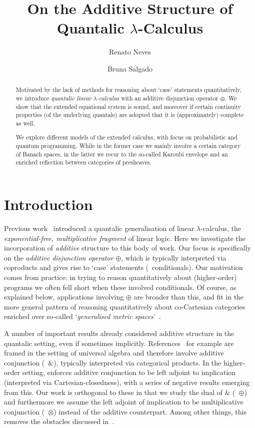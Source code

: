 \documentclass[submission,copyright,creativecommons]{eptcs}
\title{On the Additive Structure of Quantalic $\lambda$-Calculus}
\author{Renato Neves
\institute{University of Minho and INESC-TEC, Portugal}
\email{nevrenato@di.uminho.pt}
\and
Bruna Salgado
\institute{University of Minho and INESC-TEC, Portugal}
\email{...}
}
\begin{document}
\maketitle


\begin{abstract}
Motivated by the lack of methods for reasoning about `case' statements
quantitatively, we introduce \emph{quantalic linear $\lambda$-calculus} with an
additive disjunction operator $\oplus$.  We show that the extended equational
system is sound, and moreover if certain continuity properties (of the
underlying quantale) are adopted that it is (approximately) complete as well. 

We explore different models of the extended calculus, with focus on
probabilistic and quantum programming.  While in the former case we mainly
involve a certain category of Banach spaces, in the latter we recur to the
so-called Karoubi envelope and an enriched reflection between categories of
presheaves.
\end{abstract}

\section{Introduction}
Previous work~\cite{dahlqvist22,dahlqvist2023syntactic} introduced a quantalic
generalisation of linear $\lambda$-calculus, the \emph{exponential-free,
multiplicative fragment} of linear logic. Here we investigate the incorporation
of \emph{additive} structure to this body of work. Our focus is specifically on
the \emph{additive disjunction operator} $\oplus$, which is typically
interpreted via coproducts and gives rise to `case' statements (\ie\
conditionals). Our motivation comes from practice: in trying to reason
quantitatively about (higher-order) programs we often fell short when these
involved conditionals. Of course, as explained below, applications involving
$\oplus$ are broader than this, and fit in the more general pattern of
reasoning quantitatively about co-Cartesian categories enriched over so-called
`\emph{generalised metric spaces}'~\cite{paseka00}.

A number of important results already considered additive structure
in the quantalic setting, even if sometimes implicitly.
References~\cite{mardare2016quantitative,mardare2017axiomatizability,mio24,jurka24}
for example are framed in the setting of universal algebra and therefore
involve additive conjunction (\ie\ $\&$), typically interpreted via categorical
products.  In the higher-order setting, \cite{lago22} enforces additive
conjunction to be left adjoint to implication (interpreted via
Cartesian-closedness), with a series of negative results emerging from this.
Our work is orthogonal to these in that we study the dual of $\&$ (\ie\
$\oplus$) and furthermore we assume the left adjoint of implication to be
multiplicative conjunction (\ie\ $\otimes$) instead of the additive
counterpart. Among other things, this removes the obstacles discussed
in~\cite{lago22}.
\end{document}
